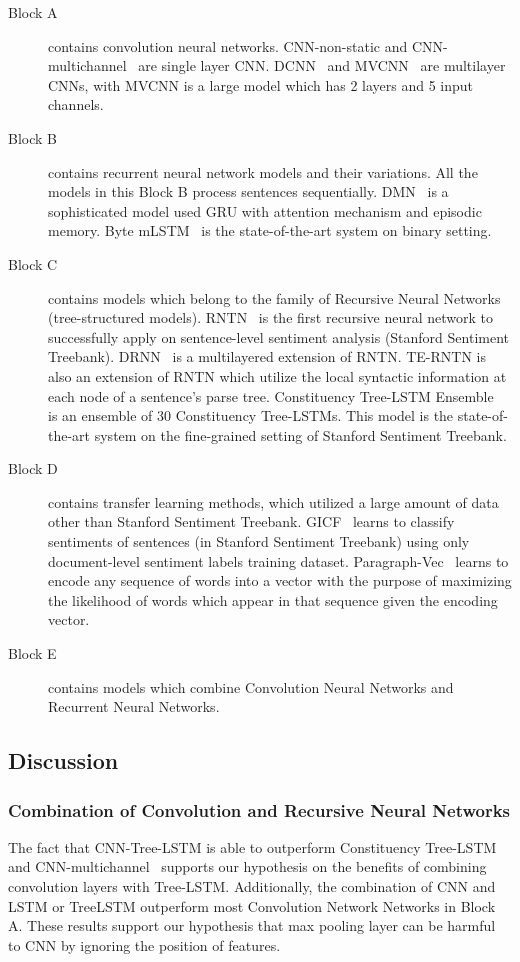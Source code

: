 \begin{description}
	\item[Block A] contains convolution neural networks.
	CNN-non-static and CNN-multichannel~\cite{KimCNN} are single layer CNN.
	DCNN~\cite{DCNN} and MVCNN~\cite{2-layer-cnn} are multilayer CNNs, with MVCNN is a large model which has 2 layers and 5 input channels.
	\item[Block B] contains recurrent neural network models and their variations.
	All the models in this Block B process sentences sequentially.
	DMN~\cite{attention-gru} is a sophisticated model used GRU with attention mechanism and episodic memory.
	Byte mLSTM~\cite{mlstm} is the state-of-the-art system on binary setting.
	\item[Block C] contains models which belong to the family of Recursive Neural Networks (tree-structured models).
	RNTN~\cite{socher2013recursive} is the first recursive neural network to successfully apply on sentence-level sentiment analysis (Stanford Sentiment Treebank).
	DRNN~\cite{IrsoyDRNN} is a multilayered extension of RNTN.
	TE-RNTN is also an extension of RNTN which utilize the local syntactic information at each node of a sentence's parse tree.
	Constituency Tree-LSTM Ensemble~\cite{LooksHHN17} is an ensemble of 30 Constituency Tree-LSTMs.
	This model is the state-of-the-art system on the fine-grained setting of Stanford Sentiment Treebank.
	\item[Block D] contains transfer learning methods, which utilized a large amount of data other than Stanford Sentiment Treebank.
	GICF~\cite{group-instance} learns to classify sentiments of sentences (in Stanford Sentiment Treebank) using only document-level sentiment labels training dataset.
	Paragraph-Vec~\cite{ParagraphVec} learns to encode any sequence of words into a vector with the purpose of maximizing the likelihood of words which appear in that sequence given the encoding vector.
	\item[Block E] contains models which combine Convolution Neural Networks and Recurrent Neural Networks.
\end{description}
\subsection{Discussion}
\subsubsection{Combination of Convolution and Recursive Neural Networks}
The fact that CNN-Tree-LSTM is able to outperform Constituency Tree-LSTM~\cite{treeLSTM} and CNN-multichannel~\cite{KimCNN} supports our hypothesis on the benefits of combining convolution layers with Tree-LSTM.
Additionally, the combination of CNN and LSTM or TreeLSTM outperform most Convolution Network Networks in Block A.
These results support our hypothesis that max pooling layer can be harmful to CNN by ignoring the position of features.
